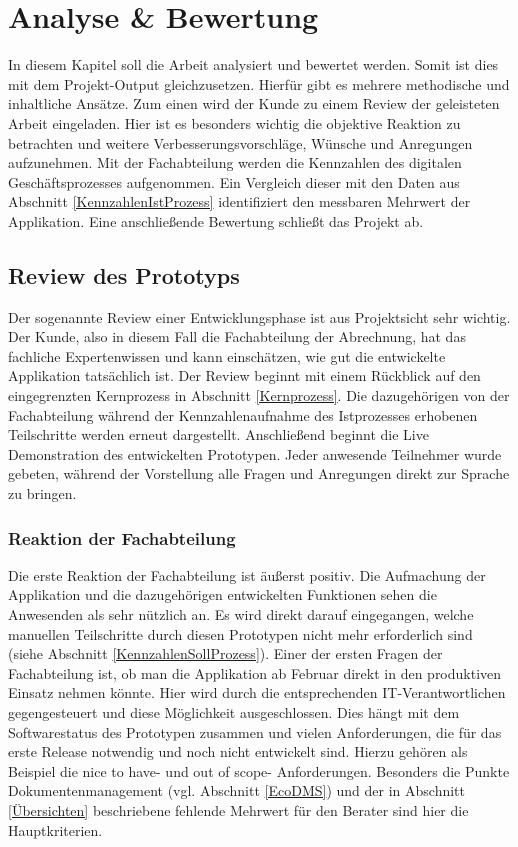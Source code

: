 \section{Analyse \& Bewertung}
In diesem Kapitel soll die Arbeit analysiert und bewertet werden. Somit ist dies mit dem Projekt-Output gleichzusetzen. Hierfür gibt es mehrere methodische und inhaltliche Ansätze. Zum einen wird der Kunde zu einem Review der geleisteten Arbeit eingeladen. Hier ist es besonders wichtig die objektive Reaktion zu betrachten und weitere Verbesserungsvorschläge, Wünsche und Anregungen aufzunehmen. Mit der Fachabteilung werden die Kennzahlen des digitalen Geschäftsprozesses aufgenommen. Ein Vergleich dieser mit den Daten aus Abschnitt \ref{KennzahlenIstProzess} identifiziert den messbaren Mehrwert der Applikation. Eine anschließende Bewertung schließt das Projekt ab.

\subsection{Review des Prototyps}
Der sogenannte Review einer Entwicklungsphase ist aus Projektsicht sehr wichtig. Der Kunde, also in diesem Fall die Fachabteilung der Abrechnung, hat das fachliche Expertenwissen und kann einschätzen, wie gut die entwickelte Applikation tatsächlich ist. Der Review beginnt mit einem Rückblick auf den eingegrenzten Kernprozess in Abschnitt \ref{Kernprozess}. Die dazugehörigen von der Fachabteilung während der Kennzahlenaufnahme des Istprozesses erhobenen Teilschritte werden erneut dargestellt. Anschließend beginnt die Live Demonstration des entwickelten Prototypen. Jeder anwesende Teilnehmer wurde gebeten, während der Vorstellung alle Fragen und Anregungen direkt zur Sprache zu bringen. 
\subsubsection{Reaktion der Fachabteilung}
Die erste Reaktion der Fachabteilung ist äußerst positiv. Die Aufmachung der Applikation und die dazugehörigen entwickelten Funktionen sehen die Anwesenden als sehr nützlich an. Es wird direkt darauf eingegangen, welche manuellen Teilschritte durch diesen Prototypen nicht mehr erforderlich sind (siehe Abschnitt \ref{KennzahlenSollProzess}). Einer der ersten Fragen der Fachabteilung ist, ob man die Applikation ab Februar direkt in den produktiven Einsatz nehmen könnte. Hier wird durch die entsprechenden IT-Verantwortlichen gegengesteuert und diese Möglichkeit ausgeschlossen. Dies hängt mit dem Softwarestatus des Prototypen zusammen und vielen Anforderungen, die für das erste Release notwendig und noch nicht entwickelt sind. Hierzu gehören als Beispiel die \glqq nice to have\grqq-{} und \glqq out of scope\grqq- Anforderungen. Besonders die Punkte Dokumentenmanagement (vgl. Abschnitt \ref{EcoDMS}) und der in Abschnitt \ref{Übersichten} beschriebene fehlende Mehrwert für den Berater sind hier die Hauptkriterien.

